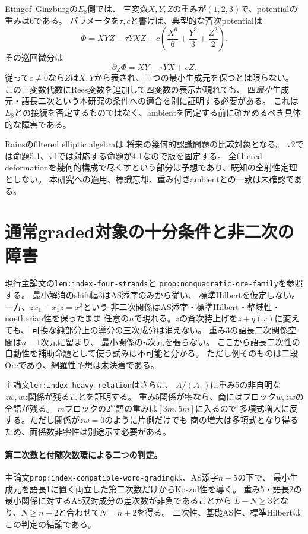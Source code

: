 \documentclass[11pt,a4paper]{ltjsarticle}
\begin{document}
Etingof--Ginzburg\cite[\S3.5, 式(3.5.1)]{EG}の$E_8$側では、
三変数$X,Y,Z$の重みが$(1,2,3)$で、potentialの重みは6である。
パラメータを$\tau,c$と書けば、典型的な斉次potentialは
\[
\Phi=XYZ-\tau YXZ+c\left(\frac{X^6}{6}+\frac{Y^3}{3}+\frac{Z^2}{2}\right).
\]
その巡回微分は
\[
\partial_Z\Phi=XY-\tau YX+cZ.
\]
従って$c\ne0$なら$Z$は$X,Y$から表され、三つの最小生成元を保つとは限らない。
この三変数代数にRees変数を追加して四変数の表示が現れても、
四\emph{最小}生成元・語長二次という本研究の条件への適合を別に証明する必要がある。
これは$E_8$との接続を否定するものではなく、ambientを同定する前に確かめるべき具体的な障害である。

Rains\cite[Proposition 5.1, Conjecture 1]{Rains}のfiltered elliptic algebraは
将来の幾何的認識問題の比較対象となる。
v2では命題5.1、v1では対応する命題が4.1なので版を固定する。
全filtered deformationを幾何的構成で尽くすという部分は予想であり、既知の全射性定理としない。
本研究への適用、標識忘却、重み付きambientとの一致は未確認である。

\section{通常graded対象の十分条件と非二次の障害}
\label{note:graded-sufficient-criteria}
現行主論文の\texttt{lem:index-four-strands}と
\texttt{prop:nonquadratic-ore-family}を参照する。
最小解消のshift幅3はAS添字のみから従い、
標準Hilbertを仮定しない。一方、$z x_1-x_1z=x_1^3$という
非二次関係はAS添字・標準Hilbert・整域性・noetherian性を保ったまま
任意の$n$で現れる。$z$の斉次持上げを$z+q(x)$に変えても、
可換な純部分上の導分の三次成分は消えない。
重み3の語長二次関係空間は$n-1$次元に留まり、
最小関係の$n$次元を張らない。
ここから語長二次性の自動性を補助命題として使う試みは不可能と分かる。
ただし例そのものは二段Oreであり、網羅性予想は未決着である。

主論文\texttt{lem:index-heavy-relation}はさらに、
$A/(A_1)$に重み5の非自明な$zw,wz$関係が残ることを証明する。
重み5関係が零なら、商にはブロック$w,zw$の全語が残る。
$m$ブロックの$2^m$語の重みは$[3m,5m]$に入るので
多項式増大に反する。ただし関係が$zw=0$のように片側だけでも
商の増大は多項式となり得るため、両係数非零性は別途示す必要がある。

\paragraph{第二次数と付随次数環による二つの判定。}
主論文\texttt{prop:index-compatible-word-grading}は、AS添字$n+5$の下で、
最小生成元を語長1に置く両立した第二次数だけからKoszul性を導く。
重み5・語長2の最小関係に対するAS双対成分の差次数が非負であることから
$L-N\ge3$となり、$N\ge n+2$と合わせて$N=n+2$を得る。
二次性、基礎AS性、標準Hilbertはこの判定の結論である。
\end{document}
